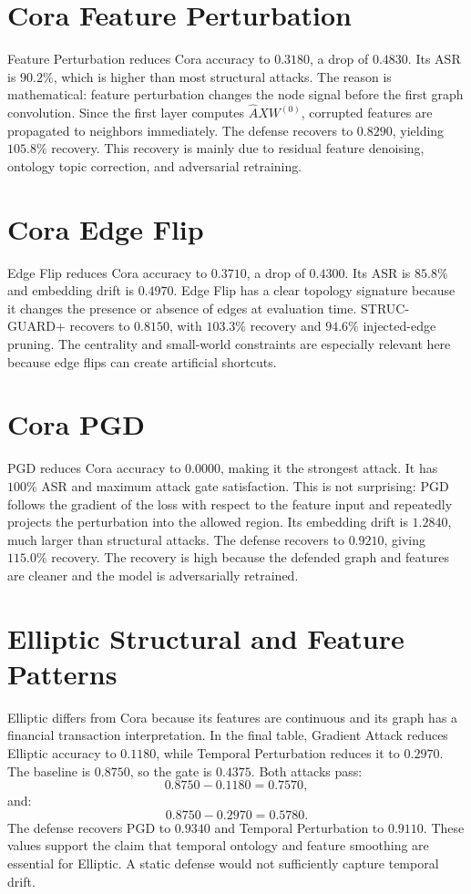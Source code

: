 \documentclass[12pt,oneside]{report}
\begin{document}
\section{Cora Feature Perturbation}
Feature Perturbation reduces Cora accuracy to $0.3180$, a drop of $0.4830$. Its ASR is $90.2\%$, which is higher than most structural attacks. The reason is mathematical: feature perturbation changes the node signal before the first graph convolution. Since the first layer computes $\hat{A}XW^{(0)}$, corrupted features are propagated to neighbors immediately. The defense recovers to $0.8290$, yielding $105.8\%$ recovery. This recovery is mainly due to residual feature denoising, ontology topic correction, and adversarial retraining.

\section{Cora Edge Flip}
Edge Flip reduces Cora accuracy to $0.3710$, a drop of $0.4300$. Its ASR is $85.8\%$ and embedding drift is $0.4970$. Edge Flip has a clear topology signature because it changes the presence or absence of edges at evaluation time. STRUC-GUARD+ recovers to $0.8150$, with $103.3\%$ recovery and $94.6\%$ injected-edge pruning. The centrality and small-world constraints are especially relevant here because edge flips can create artificial shortcuts.

\section{Cora PGD}
PGD reduces Cora accuracy to $0.0000$, making it the strongest attack. It has $100\%$ ASR and maximum attack gate satisfaction. This is not surprising: PGD follows the gradient of the loss with respect to the feature input and repeatedly projects the perturbation into the allowed region. Its embedding drift is $1.2840$, much larger than structural attacks. The defense recovers to $0.9210$, giving $115.0\%$ recovery. The recovery is high because the defended graph and features are cleaner and the model is adversarially retrained.

\section{Elliptic Structural and Feature Patterns}
Elliptic differs from Cora because its features are continuous and its graph has a financial transaction interpretation. In the final table, Gradient Attack reduces Elliptic accuracy to $0.1180$, while Temporal Perturbation reduces it to $0.2970$. The baseline is $0.8750$, so the gate is $0.4375$. Both attacks pass:
$$
0.8750-0.1180=0.7570,
$$
and:
$$
0.8750-0.2970=0.5780.
$$
The defense recovers PGD to $0.9340$ and Temporal Perturbation to $0.9110$. These values support the claim that temporal ontology and feature smoothing are essential for Elliptic. A static defense would not sufficiently capture temporal drift.
\end{document}
